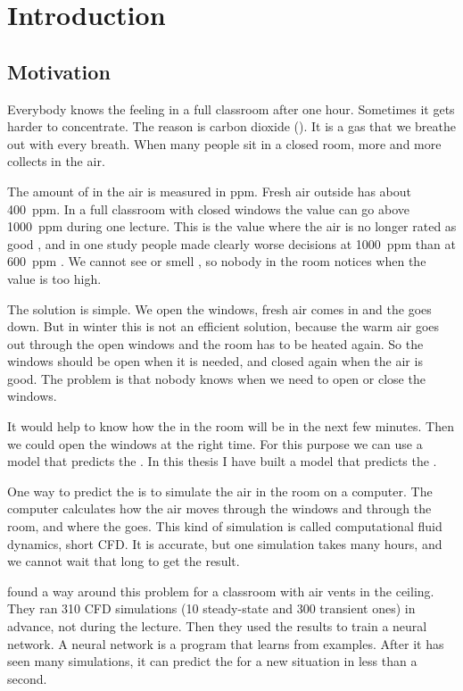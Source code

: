 \chapter{Introduction}
\label{ch:intro}

\section{Motivation}
Everybody knows the feeling in a full classroom after one hour. Sometimes it gets harder to
concentrate. The reason is carbon dioxide (\cotwo{}). It is a gas that we breathe out with every
breath. When many people sit in a closed room, more and more \cotwo{} collects in the air.

The amount of \cotwo{} in the air is measured in ppm. Fresh air outside has about 400~ppm. In a full classroom
with closed windows the value can go above 1000~ppm during one lecture. This is the value where the air is no
longer rated as good \citep{uba2008}, and in one study people made clearly worse decisions at 1000~ppm than
at 600~ppm \citep{satish2012}. We cannot see or smell \cotwo{}, so nobody in the room notices when the value
is too high.

The solution is simple. We open the windows, fresh air comes in and the \cotwo{} goes down. But in winter
this is not an efficient solution, because the warm air goes out through the open windows and the room has to
be heated again. So the
windows should be open when it is needed, and closed again when the air is good. The problem is that nobody
knows when we need to open or close the windows.

It would help to know how the \cotwo{} in the room will be in the next few minutes. Then we could open the
windows at the right time. For this purpose we can use a model that predicts the \cotwo{}.
In this thesis I have built a model that predicts the \cotwo{}.

One way to predict the \cotwo{} is to simulate the air in the room on a computer. The computer calculates
how the air moves through the windows and through the room, and where the \cotwo{} goes. This kind of
simulation is called computational fluid dynamics, short CFD. It is accurate, but one simulation takes many
hours, and we cannot wait that long to get the result.

\citet{bian2025} found a way around this problem for a classroom with air vents in the ceiling. They ran
310 CFD simulations (10 steady-state and 300 transient ones) in advance, not during the lecture. Then they used the results to train a neural network. A
neural network is a program that learns from examples. After it has seen many simulations, it can predict
the \cotwo{} for a new situation in less than a second.


